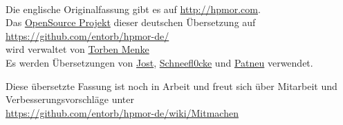 \begin{center}
~\\
Die englische Originalfassung gibt es auf {\small\url{http://hpmor.com}}.
~\\
Das \href{https://github.com/entorb/hpmor-de/}{OpenSource Projekt} dieser deutschen Übersetzung auf \\
{\small \url{https://github.com/entorb/hpmor-de/}} \\
wird verwaltet von \href{https://entorb.net}{Torben Menke}\\
Es werden Übersetzungen von \href{https://www.fanfiktion.de/s/4cb8beb50000203e067007d0/}{Jost}, \href{https://www.fanfiktion.de/s/60044849000ccc541aef297e/}{Schneefl0cke} und \href{https://www.fanfiktion.de/s/55610c610004dede273a3811/}{Patneu} verwendet.

\end{center}



\newpage
\vspace*{3cm}
\begin{center}
\noindent
Diese übersetzte Fassung ist noch in Arbeit und freut sich über Mitarbeit und Verbesserungsvorschläge unter\\
{\small\url{https://github.com/entorb/hpmor-de/wiki/Mitmachen}}
\end{center}

\newpage

